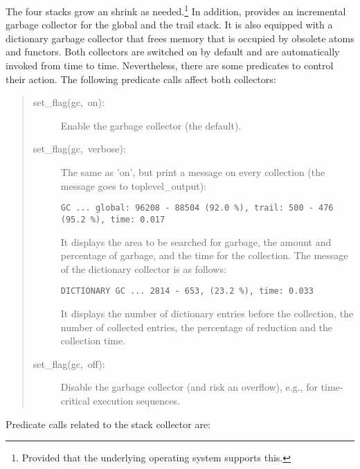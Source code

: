 The four stacks grow an shrink as needed.\footnote{%
  Provided that the underlying operating system supports this.}
In addition, {\eclipse} provides an incremental garbage collector
for the global and the trail stack.
It is also equipped with a dictionary garbage
collector that frees memory that is occupied by obsolete atoms and functors.
Both collectors are switched on by default and are automatically invoked
from time to time.
Nevertheless, there are some predicates to control their action.
The following predicate calls affect both collectors:
\begin{quote}
\begin{description}
\item [set_flag(gc,~on):]
	Enable the garbage collector (the default).
\item [set_flag(gc,~verbose):]
	The same as 'on', but print a message on every collection
	(the message goes to toplevel_output):
{\small
\begin{verbatim}
GC ... global: 96208 - 88504 (92.0 %), trail: 500 - 476 (95.2 %), time: 0.017
\end{verbatim}
}
	It displays the area to be searched for garbage, the amount
	and percentage of garbage, and the time for the collection.
	The message of the dictionary collector is as follows:
{\small
\begin{verbatim}
DICTIONARY GC ... 2814 - 653, (23.2 %), time: 0.033
\end{verbatim}
}
	It displays the number of dictionary entries before the collection,
	the number of collected entries, the percentage of reduction and
	the collection time.
\item [set_flag(gc,~off):]
	Disable the garbage collector (and risk an overflow), e.g., for
	time-critical execution sequences.
\end{description}
\end{quote}
\noindent Predicate calls related to the stack collector are:

